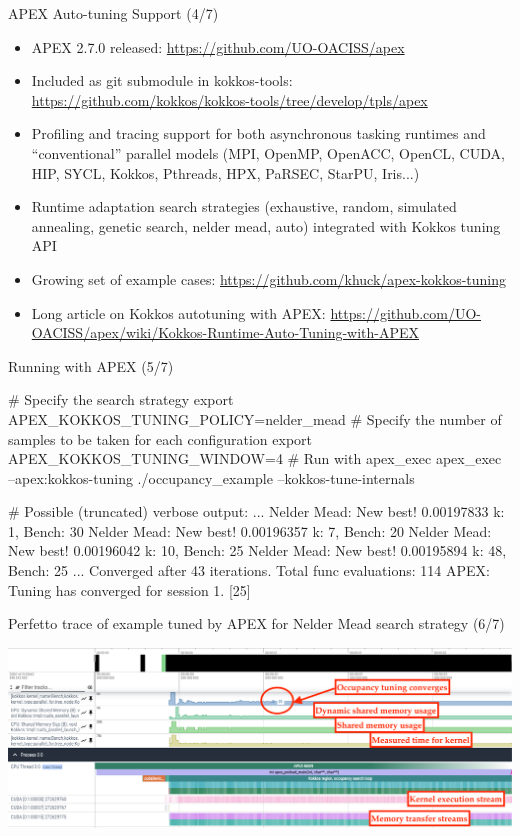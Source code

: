 \begin{frame}[fragile]{APEX Auto-tuning Support (4/7)}
  \begin{itemize}
      \item APEX 2.7.0 released: \url{https://github.com/UO-OACISS/apex}
      \item Included as git submodule in kokkos-tools: \url{https://github.com/kokkos/kokkos-tools/tree/develop/tpls/apex}
      \item Profiling and tracing support for both asynchronous tasking runtimes and ``conventional'' parallel models (MPI, OpenMP, OpenACC, OpenCL, CUDA, HIP, SYCL, Kokkos, Pthreads, HPX, PaRSEC, StarPU, Iris...)
      \item Runtime adaptation search strategies (exhaustive, random, simulated annealing, genetic search, nelder mead, auto) integrated with Kokkos tuning API
      \item Growing set of example cases: \url{https://github.com/khuck/apex-kokkos-tuning}
      \item Long article on Kokkos autotuning with APEX: \url{https://github.com/UO-OACISS/apex/wiki/Kokkos-Runtime-Auto-Tuning-with-APEX}
  \end{itemize}
\end{frame}

\begin{frame}[fragile]{Running with APEX (5/7)}
    \begin{code}[keywords={bash}]
# Specify the search strategy
export APEX_KOKKOS_TUNING_POLICY=nelder_mead
# Specify the number of samples to be taken for each configuration
export APEX_KOKKOS_TUNING_WINDOW=4
# Run with apex_exec
apex_exec --apex:kokkos-tuning ./occupancy_example --kokkos-tune-internals

# Possible (truncated) verbose output:
...
Nelder Mead: New best! 0.00197833 k: 1, Bench: 30
Nelder Mead: New best! 0.00196357 k: 7, Bench: 20
Nelder Mead: New best! 0.00196042 k: 10, Bench: 25
Nelder Mead: New best! 0.00195894 k: 48, Bench: 25
...
Converged after 43 iterations.
Total func evaluations: 114
APEX: Tuning has converged for session 1.
[25]

    \end{code}
\end{frame}

\begin{frame}[fragile]{Perfetto trace of example tuned by APEX for Nelder Mead search strategy (6/7)}
    \begin{center}
    \includegraphics[width=\linewidth]{4_5/tuning/nelder_mead_occupancy_trace.png}
    \end{center}
\end{frame}

